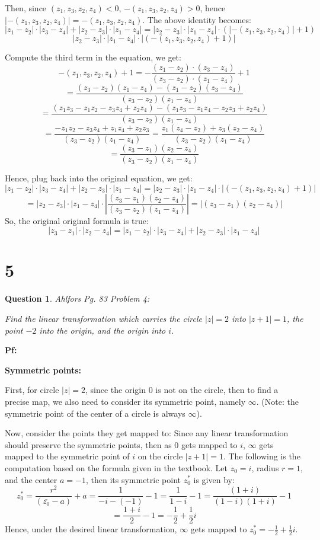 \documentclass{article}
\newtheorem{question}{Question}
\begin{document}
\hfill

Then, since $(z_1,z_3,z_2,z_4)<0$, $-(z_1,z_3,z_2,z_4)>0$, hence $|-(z_1,z_3,z_2,z_4)|=-(z_1,z_3,z_2,z_4)$. The above identity becomes:
$$|z_1-z_2|\cdot|z_3-z_4|+|z_2-z_3|\cdot|z_1-z_4|=|z_2-z_3|\cdot|z_1-z_4|\cdot(|-(z_1,z_3,z_2,z_4)|+1)$$
$$|z_2-z_3|\cdot|z_1-z_4|\cdot|(-(z_1,z_3,z_2,z_4)+1)|$$

Compute the third term in the equation, we get:
$$-(z_1,z_3,z_2,z_4)+1=-\frac{(z_1-z_2)\cdot(z_3-z_4)}{(z_3-z_2)\cdot(z_1-z_4)}+1$$
$$=\frac{(z_3-z_2)(z_1-z_4)-(z_1-z_2)(z_3-z_4)}{(z_3-z_2)(z_1-z_4)}$$
$$=\frac{(z_1z_3-z_1z_2-z_3z_4+z_2z_4)-(z_1z_3-z_1z_4-z_2z_3+z_2z_4)}{(z_3-z_2)(z_1-z_4)}$$
$$=\frac{-z_1z_2-z_3z_4+z_1z_4+z_2z_3}{(z_3-z_2)(z_1-z_4)}=\frac{z_1(z_4-z_2)+z_3(z_2-z_4)}{(z_3-z_2)(z_1-z_4)}$$
$$=\frac{(z_3-z_1)(z_2-z_4)}{(z_3-z_2)(z_1-z_4)}$$

Hence, plug back into the original equation, we get:
$$|z_1-z_2|\cdot|z_3-z_4|+|z_2-z_3|\cdot|z_1-z_4|=|z_2-z_3|\cdot|z_1-z_4|\cdot|(-(z_1,z_3,z_2,z_4)+1)|$$
$$=|z_2-z_3|\cdot|z_1-z_4|\cdot\left|\frac{(z_3-z_1)(z_2-z_4)}{(z_3-z_2)(z_1-z_4)}\right|=\left|(z_3-z_1)(z_2-z_4)\right|$$
So, the original original formula is true:
$$|z_3-z_1|\cdot|z_2-z_4|=|z_1-z_2|\cdot|z_3-z_4|+|z_2-z_3|\cdot|z_1-z_4|$$


\break

\section*{5}
\begin{myBox}[]{}
    \begin{question}
        Ahlfors Pg. 83 Problem 4:

        Find the linear transformation which carries the circle $|z|=2$ into $|z+1|=1$,
        the point $-2$ into the origin, and the origin into $i$.
    \end{question}
\end{myBox}

\textbf{Pf:}

\textbf{Symmetric points:}

First, for circle $|z|=2$, since the origin $0$ is not on the circle, then to find a precise map, we also need to consider
its symmetric point, namely $\infty$. (Note: the symmetric point of the center of a circle is always $\infty$).

\hfill

Now, consider the points they get mapped to: Since any linear transformation should preserve the symmetric points,
then as $0$ gets mapped to $i$, $\infty$ gets mapped to the symmetric point of $i$ on the circle $|z+1|=1$.
The following is the computation based on the formula given in the textbook. Let $z_0=i$, radius $r=1$, and the center $a=-1$, then its symmetric point $z_0^*$ is given by:
$$z_0^*=\frac{r^2}{(\bar{z_0}-a)}+a = \frac{1}{-i-(-1)}-1 = \frac{1}{1-i}-1 = \frac{(1+i)}{(1-i)(1+i)}-1$$
$$=\frac{1+i}{2}-1 = -\frac{1}{2}+\frac{1}{2}i$$
Hence, under the desired linear transformation, $\infty$ gets mapped to $z_0^*=-\frac{1}{2}+\frac{1}{2}i$.
\end{document}
